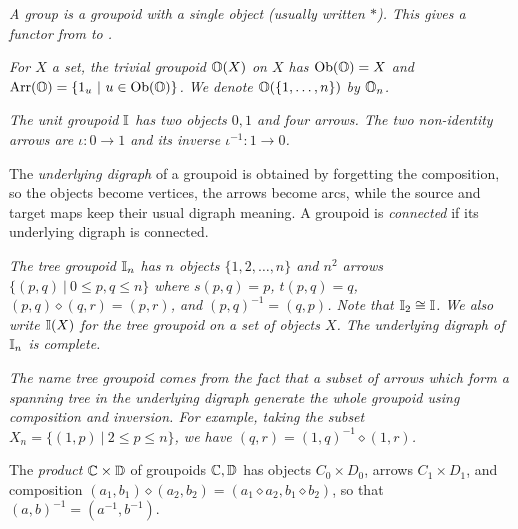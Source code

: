 \begin{example} 
\emph{A group is a groupoid with a single object (usually written $*$). 
This gives a functor \Groupoid\; from \catGp\; to \catGpd.} 
\end{example}

\begin{example} \label{ex:triv-gpd} 
\emph{For $X$ a set, the \emph{trivial groupoid $\mathbb{O}(X)$ on $X$} 
has $\mathrm{Ob}(\mathbb{O})=X$ and $\mathrm{Arr}(\mathbb{O})=\{1_u ~|~ u \in \mathrm{Ob}(\mathbb{O})\}$. 
We denote $\mathbb{O}(\{1,\ldots,n\})$ by $\mathbb{O}_n$.} 
\end{example}

\begin{example} \label{ex:unit-gpd}  
\emph{The \emph{unit groupoid} $\mathbb{I}$ has two objects $0,1$ and four arrows. 
The two non-identity arrows are $\iota : 0 \to 1$ 
and its inverse $\iota^{-1} : 1 \to 0$.} 
\end{example}

The \emph{underlying digraph} of a groupoid 
is obtained by forgetting the composition, 
so the objects become vertices, the arrows become arcs, 
while the source and target maps keep their usual digraph meaning. 
A groupoid is \emph{connected} if its underlying digraph is connected. 

\begin{example} \label{ex:tree-groupoid}  
\emph{The \emph{tree groupoid} $\mathbb{I}_n$ has $n$ objects $\{1,2,\ldots,n\}$ 
and $n^2$ arrows $\{(p,q) ~|~ 0 \leqslant p,q \leqslant n\}$ where 
$s(p,q)=p$, $t(p,q)=q$, $(p,q)\diamond(q,r) = (p,r)$, 
and $(p,q)^{-1} = (q,p)$. 
Note that $\mathbb{I}_2 \cong \mathbb{I}$. 
We also write $\mathbb{I}(X)$ for the tree groupoid on a set of objects $X$. 
The underlying digraph of $\mathbb{I}_n$ is complete.} 

\emph{The name tree groupoid comes from the fact that a subset of arrows 
which form a spanning tree in the underlying digraph generate the 
whole groupoid using composition and inversion. 
For example, 
taking the subset $X_n = \{(1,p) ~|~ 2 \leqslant p \leqslant n\}$, 
we have $(q,r) = (1,q)^{-1}\diamond(1,r)$.} 
\end{example}

The \emph{product} $\mathbb{C}\times\mathbb{D}$ of groupoids $\mathbb{C},\mathbb{D}$ 
has objects $C_0 \times D_0$, arrows $C_1 \times D_1$, 
and composition 
$(a_1,b_1)\diamond(a_2,b_2) = (a_1 \diamond a_2, b_1 \diamond b_2)$, 
so that $(a,b)^{-1} = (a^{-1},b^{-1})$. 

